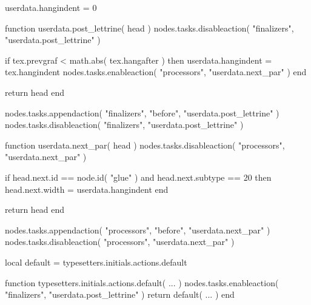 %
%

%
% 
%
\startluacode
  userdata.hangindent = 0

  function userdata.post_lettrine( head )
    nodes.tasks.disableaction( "finalizers", "userdata.post_lettrine" )

    if tex.prevgraf < math.abs( tex.hangafter ) then
      userdata.hangindent = tex.hangindent
      nodes.tasks.enableaction( "processors", "userdata.next_par" )
    end

    return head
  end

  nodes.tasks.appendaction( "finalizers", "before", "userdata.post_lettrine" )
  nodes.tasks.disableaction( "finalizers", "userdata.post_lettrine" )

  function userdata.next_par( head )
    nodes.tasks.disableaction( "processors", "userdata.next_par" )

    if head.next.id == node.id( "glue" ) and
      head.next.subtype == 20
    then
      head.next.width = userdata.hangindent
    end

    return head
  end

  nodes.tasks.appendaction( "processors", "before", "userdata.next_par" )
  nodes.tasks.disableaction( "processors", "userdata.next_par" )

  local default = typesetters.initials.actions.default

  function typesetters.initials.actions.default( ... )
    nodes.tasks.enableaction( "finalizers", "userdata.post_lettrine" )
    return default( ... )
  end
\stopluacode

\setupinitial[
  n=2,
  style=TextFontChapter,
]

